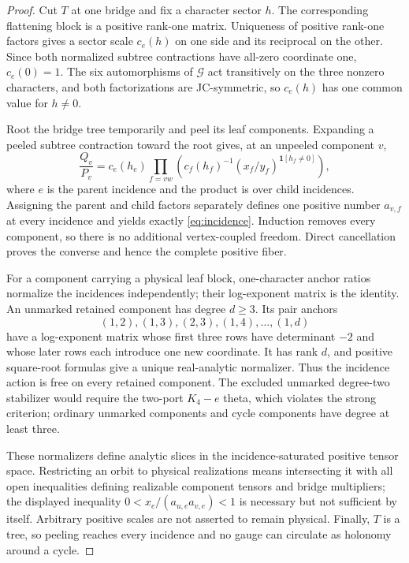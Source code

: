 \documentclass[11pt]{article}
\theoremstyle{remark}
\newcommand{\State}{\mathcal G}
\begin{document}
\begin{proof}
Cut $T$ at one bridge and fix a character sector $h$.  The corresponding
flattening block is a positive rank-one matrix.  Uniqueness of positive
rank-one factors gives a sector scale $c_e(h)$ on one side and its reciprocal
on the other.  Since both normalized subtree contractions have all-zero
coordinate one, $c_e(0)=1$.  The six automorphisms of
$\State$ act transitively on the three nonzero characters, and both factorizations
are JC-symmetric, so $c_e(h)$ has one common value for $h\ne0$.

Root the bridge tree temporarily and peel its leaf components.  Expanding a
peeled subtree contraction toward the root gives, at an unpeeled component
$v$,
\[
\frac{Q_v}{P_v}=
c_e(h_e)\prod_{f=vw}
\left(c_f(h_f)^{-1}(x_f/y_f)^{\mathbf1[h_f\ne0]}\right),
\]
where $e$ is the parent incidence and the product is over child incidences.
Assigning the parent and child factors separately defines one positive number
$a_{v,f}$ at every incidence and yields exactly \eqref{eq:incidence}.
Induction removes every component, so there is no additional vertex-coupled
freedom.  Direct cancellation proves the converse and hence the complete
positive fiber.

For a component carrying a physical leaf block, one-character anchor ratios
normalize the incidences independently; their log-exponent matrix is the
identity.  An unmarked retained component has degree $d\ge3$.  Its pair
anchors
\[
(1,2),(1,3),(2,3),(1,4),\ldots,(1,d)
\]
have a log-exponent matrix whose first three rows have determinant $-2$ and
whose later rows each introduce one new coordinate.  It has rank $d$, and
positive square-root formulas give a unique real-analytic normalizer.  Thus
the incidence action is free on every retained component.  The excluded
unmarked degree-two stabilizer would require the two-port $K_4-e$ theta,
which violates the strong criterion; ordinary unmarked components and cycle
components have degree at least three.

These normalizers define analytic slices in the incidence-saturated positive
tensor space.  Restricting an orbit to physical realizations means
intersecting it with all open inequalities defining realizable component
tensors and bridge multipliers; the displayed inequality
$0<x_e/(a_{u,e}a_{v,e})<1$ is necessary but not sufficient by itself.
Arbitrary positive scales are not asserted to remain physical.  Finally,
$T$ is a tree, so peeling reaches every incidence and no gauge can circulate
as holonomy around a cycle.
\end{proof}
\end{document}
